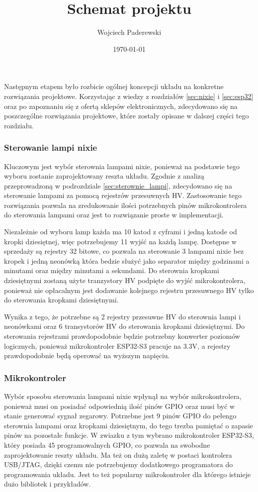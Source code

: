 \documentclass[../main.tex]{subfiles}
\author{Wojciech Paderewski}
\date{\today}
\title{Schemat projektu}
\begin{document}
Następnym etapem było rozbicie ogólnej koncepcji układu na konkretne rozwiązania projektowe.
Korzystając z wiedzy z rozdziałów \ref{sec:nixie} i \ref{sec:esp32} oraz po zapoznaniu się z ofertą sklepów elektronicznych,
zdecydowano się na poszczególne rozwiązania projektowe, które zostały opisane w dalszej części tego rozdziału.

\subsubsection{Sterowanie lampi nixie}
Kluczowym jest wybór sterownia lampami nixie, ponieważ na podstawie tego wyboru zostanie zaprojektowany reszta układu.
Zgodnie z analizą przeprowadzoną w podrozdziale \ref{sec:sterownie_lampi}, zdecydowano się na sterowanie lampami za pomocą rejestrów przesuwnych HV.
Zastosowanie tego rozwiązania pozwala na zredukowanie ilości potrzebnych pinów mikrokontrolera do sterowania lampami oraz jest to rozwiązanie proste w implementacji.

Niezależnie od wyboru lamp każda ma 10 katod z cyframi i jedną katode od kropki dziesiętnej, więc potrzebujemy 11 wyjść na każdą lampę.
Dostępne w sprzedaży są rejestry 32 bitowe, co pozwala na sterowanie 3 lampami nixie bez kropek i jedną neonówką która bedzie
służyć jako separator między godzinami a minutami oraz między minutami a sekundami. Do sterownia kropkami dziesiętnymi zostaną użyte tranzystory HV podpięte do wyjść mikrokontrolera,
ponieważ nie opłacalnym jest dodawanie kolejnego rejestru przesuwnego HV tylko do sterowania kropkami dziesiętnymi.

Wynika z tego, że potrzebne są 2 rejestry przesuwne HV do sterownia lampi i neonówkami oraz 6 transystorów HV do sterowania kropkami dziesiętnymi.
Do sterowania rejestrami prawdopodobnie będzie potrzebny konwerter poziomów logicznych, ponieważ mikrokontroler ESP32-S3 pracuje na 3.3V, a rejestry prawdopodobnie będą operować na wyższym napięciu.
\subsubsection{Mikrokontroler}
Wybór sposobu sterowania lampami nixie wpłynął na wybór mikrokontrolera, ponieważ musi on posiadać odpowiednią ilość pinów GPIO oraz musi być w stanie generować sygnał zegarowy.
Potrzebne jest 9 pinów GPIO do pełengo sterownia lampami oraz kropkami dziesiętnym, do tego trezba pamiętać o zapasie pinów na pozostałe funkcje. W zwiazku z tym
wybrano mikrokontroler ESP32-S3, który posiada 45 programowalnych GPIO, co pozwala na swobodne zaprojektowanie reszty układu. Ma też on dużą zaletę w postaci kontrolera USB/JTAG,
dzięki czemu nie potrzebujemy dodatkowego programatora do programowania układu. Jest to też popularny mikrokontroler dla którego istnieje dużo bibliotek i przykładów.
\end{document}
